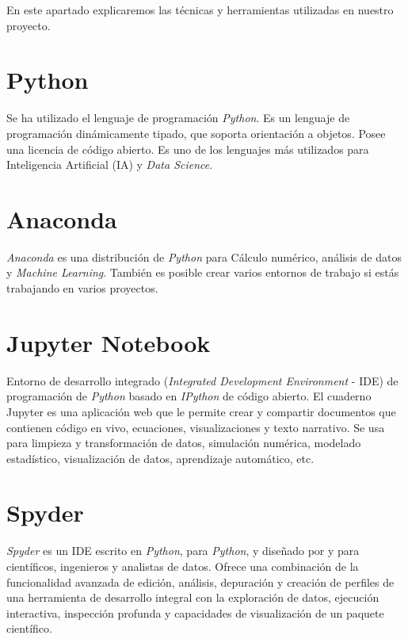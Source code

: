 
En este apartado explicaremos las técnicas y herramientas utilizadas en nuestro proyecto.

\section{Python}

Se ha utilizado el lenguaje de programación \textit{Python}. Es un lenguaje de programación dinámicamente tipado, que soporta orientación a objetos. Posee una licencia de código abierto. Es uno de los lenguajes más utilizados para Inteligencia Artificial (IA) y  \textit{Data Science}.

\section{Anaconda}

\textit{Anaconda} es una distribución de  \textit{Python} para Cálculo numérico, análisis de datos y \textit{Machine Learning}. También es posible crear varios entornos de trabajo si estás trabajando en varios proyectos.

\section{Jupyter Notebook}

Entorno de desarrollo integrado (\textit{Integrated Development Environment} - IDE) de programación de \textit{Python} basado en \textit{IPython} de código abierto. El cuaderno Jupyter es una aplicación web que le permite crear y compartir documentos que contienen código en vivo, ecuaciones, visualizaciones y texto narrativo. Se usa para limpieza y transformación de datos, simulación numérica, modelado estadístico, visualización de datos, aprendizaje automático, etc.

\section{Spyder}

\textit{Spyder} es un IDE escrito en \textit{Python}, para \textit{Python}, y diseñado por y para científicos, ingenieros y analistas de datos. Ofrece una combinación de la funcionalidad avanzada de edición, análisis, depuración y creación de perfiles de una herramienta de desarrollo integral con la exploración de datos, ejecución interactiva, inspección profunda y capacidades de visualización de un paquete científico.

